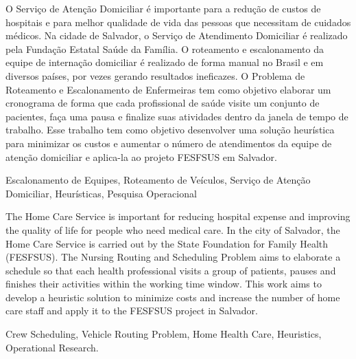
\resumo
O Serviço de Atenção Domiciliar é importante para a redução de custos de hospitais e para melhor qualidade de vida das pessoas que necessitam de cuidados médicos.
Na cidade de Salvador, o Serviço de Atendimento Domiciliar é realizado pela Fundação Estatal Saúde da Família.
O roteamento e escalonamento da equipe de internação domiciliar é realizado de forma manual no Brasil e em diversos países, por vezes gerando resultados ineficazes.
O Problema de Roteamento e Escalonamento de Enfermeiras tem como objetivo elaborar um cronograma de forma que cada profissional de saúde visite um conjunto de pacientes, faça uma pausa e finalize suas atividades dentro da janela de tempo de trabalho.
Esse trabalho tem como objetivo desenvolver uma solução heurística para minimizar os custos e aumentar o número de atendimentos da equipe de atenção domiciliar e aplica-la ao projeto FESFSUS em Salvador.
\begin{keywords}
Escalonamento de Equipes, Roteamento de Veículos, Serviço de Atenção Domiciliar, Heurísticas, Pesquisa Operacional
\end{keywords}


\abstract
The Home Care Service is important for reducing hospital expense and improving the quality of life for people who need medical care.
In the city of Salvador, the Home Care Service is carried out by the State Foundation for Family Health (FESFSUS).
The Nursing Routing and Scheduling Problem aims to elaborate a schedule so that each health professional visits a group of patients, pauses and finishes their activities within the working time window.
This work aims to develop a heuristic solution to minimize costs and increase the number of home care staff and apply it to the FESFSUS project in Salvador.
\begin{keywords}
Crew Scheduling, Vehicle Routing Problem, Home Health Care, Heuristics, Operational Research.
\end{keywords}
